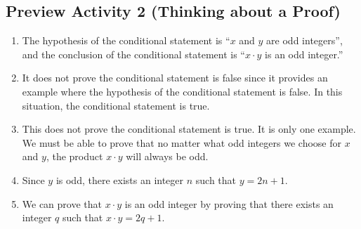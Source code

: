 \subsection*{Preview Activity 2 (Thinking about a Proof)}
\begin{enumerate}
\item The hypothesis of the conditional statement is ``$x$  and  $y$  are odd integers'', and the conclusion of the conditional statement is ``$x \cdot y$ is an odd integer.''

\item It does not prove the conditional statement is false since it provides an example where the hypothesis of the conditional statement is false.  In this situation, the conditional statement is true.

\item This does not prove the conditional statement is true.  It is only one example.  We must be able to prove that no matter what odd integers we choose for  $x$  and  $y$, the product  
$x \cdot y$  will always be odd.

\item Since $y$ is odd, there exists an integer $n$ such that $y = 2n + 1$.

\item We can prove that $x \cdot y$ is an odd integer by proving that there exists an integer $q$ such that 
$x \cdot y = 2q + 1$.

%
%
%
\end{enumerate}

\hbreak
\newpage

\endinput
